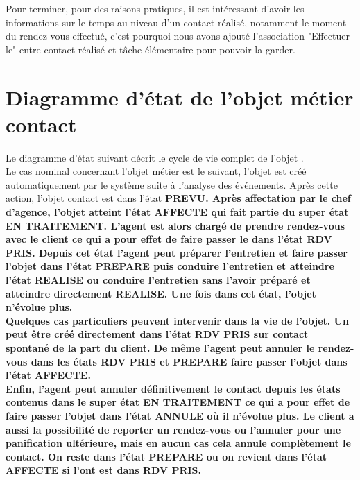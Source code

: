 Pour terminer, pour des raisons pratiques, il est intéressant d'avoir les informations sur le temps au niveau d'un contact réalisé, notamment le moment du rendez-vous effectué, c'est pourquoi nous avons ajouté l'association "Effectuer le" entre contact réalisé et tâche élémentaire pour pouvoir la garder. \\

\section{Diagramme d’état de l'objet métier \bf{contact}}

Le diagramme d'état suivant décrit le cycle de vie complet de l'objet . \\

Le cas nominal concernant l'objet métier  est le suivant, l'objet est créé automatiquement par le système suite à l'analyse des événements. Après cette action, l'objet contact est dans l'état \bf{PREVU}. Après affectation par le chef d'agence, l'objet  atteint l'état \bf{AFFECTE} qui fait partie du super état \bf{EN TRAITEMENT}. L'agent est alors chargé de prendre rendez-vous avec le client ce qui a pour effet de faire passer le  dans l'état \bf{RDV PRIS}. Depuis cet état l'agent peut préparer l'entretien et faire passer l'objet  dans l'état \bf{PREPARE} puis conduire l'entretien et atteindre l'état \bf{REALISE} ou conduire l'entretien sans l'avoir préparé et atteindre directement \bf{REALISE}. Une fois dans cet état, l'objet  n'évolue plus. \\

Quelques cas particuliers peuvent intervenir dans la vie de l'objet. Un  peut être créé directement dans l'état \bf{RDV PRIS} sur contact spontané de la part du client. De même l'agent peut annuler le rendez-vous dans les états \bf{RDV PRIS} et \bf{PREPARE} faire passer l'objet  dans l'état \bf{AFFECTE}. \\

Enfin, l'agent peut annuler définitivement le contact depuis les états contenus dans le super état \bf{EN TRAITEMENT} ce qui a pour effet de faire passer l'objet  dans l'état \bf{ANNULE} où il n'évolue plus. Le client a aussi la possibilité de reporter un rendez-vous ou l'annuler pour une panification ultérieure, mais en aucun cas cela annule complètement le contact. On reste dans l'état \bf{PREPARE} ou on revient dans l'état \bf{AFFECTE} si l'ont est dans \bf{RDV PRIS}.

